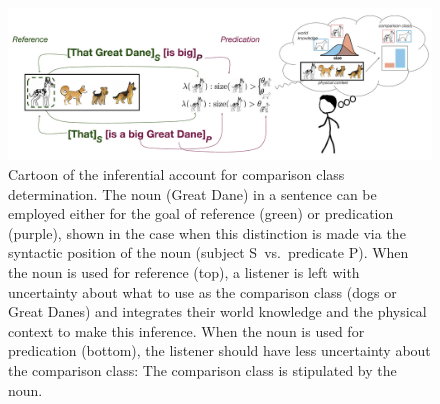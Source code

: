 \documentclass[10pt,letterpaper]{article}
\begin{document}


\begin{figure}[t]
\begin{center}
\includegraphics[width=0.9\linewidth]{ref-pred-cartoon-w-subscripts2.pdf}
\end{center}
\caption{Cartoon of the inferential account for comparison class determination. The noun (Great Dane) in a sentence can be employed either for the goal of reference (green) or predication (purple), shown in the case when this distinction is made via the syntactic position of the noun (subject S~vs.~predicate P). When the noun is used for reference (top), a listener is left with uncertainty about what to use as the comparison class (dogs or Great Danes) and integrates their world knowledge and the physical context to make this inference.  When the noun is used for predication (bottom), the listener should have less uncertainty about the comparison class: The comparison class is stipulated by the noun.}
\label{model-cartoon}
\end{figure}
\end{document}
